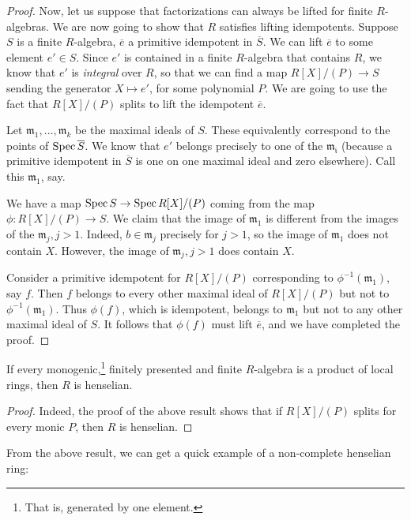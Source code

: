 \begin{proof}
Now, let us suppose that factorizations can always be lifted for finite
$R$-algebras. We are now going
to show that $R$ satisfies lifting idempotents. 
Suppose $S$ is a finite $R$-algebra, $\overline{e}$ a primitive idempotent in
$\overline{S}$. 
We can lift $\overline{e}$ to some element $e' \in S$. Since $e'$ is contained
in a finite $R$-algebra that contains $R$, we know that $e'$ is \emph{integral} over $R$, 
so that we can find a map $R[X]/(P) \to S$ sending the generator $X \mapsto
e'$, for some polynomial $P$.
We are going to use the fact that $R[X]/(P)$ splits to lift the idempotent
$\overline{e}$.

Let $\mathfrak{m}_1, \dots, \mathfrak{m}_k$ be the maximal ideals of $S$.
These equivalently correspond to the points of $\operatorname{Spec} \overline{S}$. We know
that $e'$ belongs precisely to one of the $\mathfrak{m_i}$ (because a
primitive idempotent in $\overline{S}$ is one on one maximal ideal and zero
elsewhere). Call this $\mathfrak{m}_1$, say.

We have a map $\operatorname{Spec} S \to \operatorname{Spec} R[X]/(P)$ coming from the map $\phi:
R[X]/(P) \to S$. We claim that the image of
$\mathfrak{m}_1$ is different from the images of the $\mathfrak{m}_j, j > 1$.
Indeed, $b \in \mathfrak{m}_j$ precisely for $j > 1$, so the image of
$\mathfrak{m}_1$ does not contain $X$. However, the image of $\mathfrak{m}_j,
j> 1$ does contain $X$.

Consider a primitive idempotent for $R[X]/(P)$ corresponding to
$\phi^{-1}(\mathfrak{m}_1)$, say $f$.  Then $f$ belongs to every other maximal
ideal of $R[X]/(P)$ but not to $\phi^{-1}(\mathfrak{m}_1)$. Thus $\phi(f)$,
which is idempotent,
belongs to $\mathfrak{m}_1$ but not to any other maximal ideal of $S$. 
It follows that  $\phi(f)$ must lift $\overline{e} $, and we have completed
the proof.
\end{proof} 


\begin{corollary} 
If every monogenic,\footnote{That is, generated by one element.} finitely
presented and finite $R$-algebra is a product of local rings, then $R$ is
henselian.
\end{corollary} 
\begin{proof} 
Indeed, the proof of the above result shows that if $R[X]/(P)$ splits for
every monic $P$, then $R$ is henselian.
\end{proof} 


From the above result, we can get a quick example of a non-complete henselian
ring:

